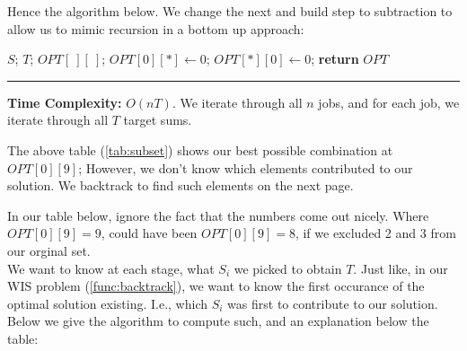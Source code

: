     \noindent
    Hence the algorithm below. We change the next and build step to subtraction to allow us to mimic recursion in a 
    bottom up approach:
    \begin{Func}

        \vspace{-.5em}
        \begin{algorithm}[H]
            \SetAlgoLined
            $S$; $T$; $OPT[\ ][\ ]$; 
            $OPT[0][*] \gets 0$; 
            $OPT[*][0] \gets 0$; 
            \textbf{return} $OPT$\;
        \end{algorithm}
        \noindent
        \rule{\textwidth}{0.4pt}
        \textbf{Time Complexity:} $O(nT)$. We iterate through all $n$ jobs, and for each job, we iterate through all $T$ target sums.
    \end{Func}

    \noindent
    The above table (\ref{tab:subset}) shows our best possible combination at $OPT[0][9]$; However, we don't know which elements
    contributed to our solution. We backtrack to find such elements on the next page.

    \newpage 

    \noindent
    In our table below, ignore the fact that the numbers come out nicely. Where $OPT[0][9]=9$, could have been $OPT[0][9]=8$, if we excluded 2 and 3 from our orginal set.\\

    \noindent
    We want to know at each stage, what $S_i$ we picked to obtain $T$. Just like, in our WIS problem (\ref{func:backtrack}), we want to know 
    the first occurance of the optimal solution existing. I.e., which $S_i$ was first to contribute to our solution.\\
    
    \noindent
    Below we give the algorithm to compute such, and an explanation below the table:
    

